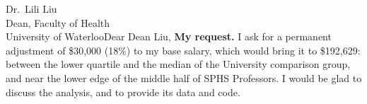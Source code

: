 \begin{aprletter}{%
Dr.\ Lili Liu\\
Dean, Faculty of Health\\
University of Waterloo}{Dear Dean Liu,}
\textbf{My request.} I ask for a permanent adjustment of \$30,000 (18\%) to my base salary, which would bring it to \$192,629: between the lower quartile and the median of the University comparison group, and near the lower edge of the middle half of SPHS Professors. I would be glad to discuss the analysis, and to provide its data and code.


\end{aprletter}

